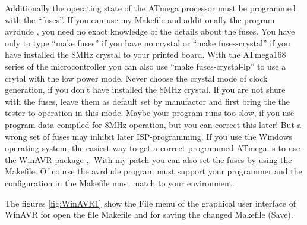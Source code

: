 Additionally the operating state of the
ATmega processor must be programmed with the ``fuses''.
If you can use my Makefile and additionally the program avrdude \cite{avrdude}, you need no exact
knowledge of the details about the fuses. You have only to type ``make fuses'' if you
have no crystal or ``make fuses-crystal'' if you have installed the 8MHz crystal to your printed board.
With the ATmega168 series of the microcontroller you can also use ``make fuses-crystal-lp'' to use
a crytal with the low power mode.
Never choose the crystal mode of clock generation, if you don't have installed
the 8MHz crystal. If you are not shure with the fuses, leave them as default
set by manufactor and first bring the the tester to operation in this mode.
Maybe your program runs too slow, if you use program data compiled for
8MHz operation, but you can correct this later! But a wrong set of fuses may inhibit
later ISP-programming.
If you use the Windows operating system, the easiest way to get a correct programmed
ATmega is to use the WinAVR package \cite{winavr1},\cite{winavr2}.
With my patch \cite{winavr3} you can also set the fuses by using the Makefile.
Of course the avrdude program must support your programmer and the configuration
in the Makefile must match to your environment.

The figures \ref{fig:WinAVR1} show the File menu of the graphical user interface of WinAVR for
open the file Makefile and for saving the changed Makefile (Save).

